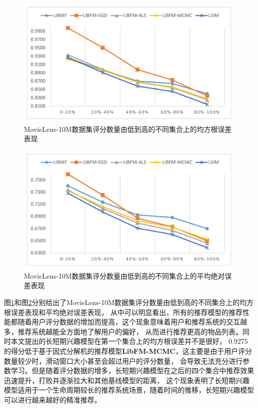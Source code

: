 \begin{figure}[htbp]
    \centering
    \includegraphics[scale=0.36]{images/rank_rmse.pdf}
    \caption{MovieLens-10M数据集评分数量由低到高的不同集合上的均方根误差表现}
    \label{fig:rank_rsme}
\end{figure}

\begin{figure}[htbp]
    \centering
    \includegraphics[scale=0.36]{images/rank_mae.pdf}
    \caption{MovieLens-10M数据集评分数量由低到高的不同集合上的平均绝对误差表现}
    \label{fig:rank_mae}
\end{figure}

图\ref{fig:rank_rsme}和图\ref{fig:rank_mae}分别给出了MovieLens-10M数据集评分数量由低到高的不同集合上的均方根误差表现和平均绝对误差表现，
从中可以明显看出，所有的推荐模型的推荐性能都随着用户评分数据的增加而提高，这个现象意味着用户和推荐系统的交互越多，推荐系统越能全方面地了解用户的偏好，
从而进行推荐更高的物品列表。同时本文提出的长短期兴趣模型在第一个集合上的均方根误差并不是很好，
$0.9275$的得分低于基于因式分解机的推荐模型\textbf{LibFM-MCMC}，这主要是由于用户评分数量较少时，滑动窗口大小甚至会超过用户的评分数量，
会导致无法充分进行参数学习。但是随着评分数据的增多，长短期兴趣模型在之后的四个集合中推荐效果迅速提升，打败并逐渐拉大和其他基线模型的距离，
这个现象表明了长短期兴趣模型适用于一个生命周期较长的推荐系统场景，随着时间的推移，长短期兴趣模型可以进行越来越好的精准推荐。


